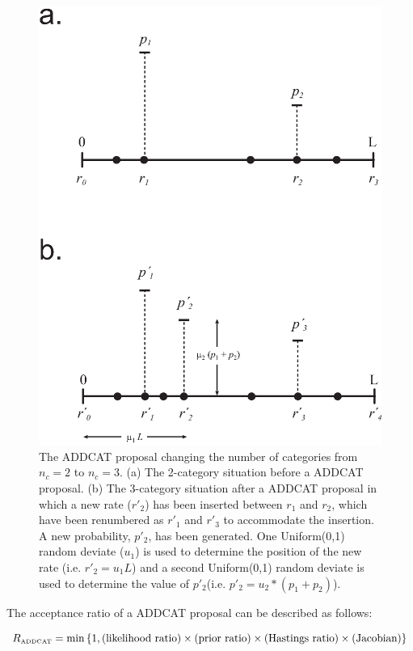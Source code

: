 \documentclass[12pt]{article}
\newcommand{\ncat}{n_c}
\begin{document}
%
%
\begin{figure}
\centering
\hfil\includegraphics[scale=0.7]{addcat.eps}\hfil
\caption{The ADDCAT proposal changing the number of categories from $\ncat = 2$ to $\ncat = 3$. (a) The 2-category situation before a ADDCAT proposal. (b) The 3-category situation after a ADDCAT proposal in which a new rate ($r'_2$) has been inserted between $r_1$ and $r_2$, which have been renumbered as $r'_1$ and $r'_3$ to accommodate the insertion. A new probability, $p'_2$, has been generated. One Uniform(0,1) random deviate ($u_1$) is used to determine the position of the new rate (i.e. $r'_2 = u_1 L$) and a second Uniform(0,1) random deviate is used to determine the value of $p'_2$(i.e. $p'_2 = u_2*(p_1 + p_2)$).}
\label{addcat}
\end{figure}

The acceptance ratio of a ADDCAT proposal can be described as follows:

\[ R_{\mbox{\tiny ADDCAT}} = \min \left\{1, (\mbox{likelihood ratio}) \times (\mbox{prior ratio}) \times (\mbox{Hastings ratio}) \times (\mbox{Jacobian}) \right\} \]
\end{document}
